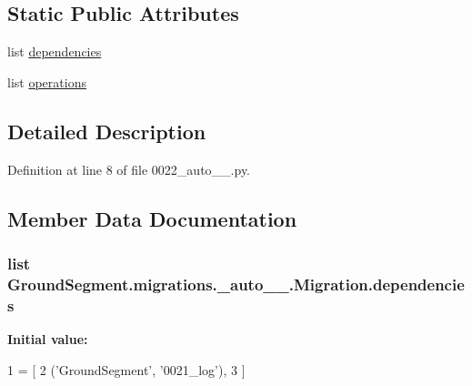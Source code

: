 \subsection*{Static Public Attributes}
\begin{DoxyCompactItemize}
\item 
list \hyperlink{class_ground_segment_1_1migrations_1_10022__auto__20161202__1258_1_1_migration_af42c26c63acd24177854a8b094bf46c3}{dependencies}
\item 
list \hyperlink{class_ground_segment_1_1migrations_1_10022__auto__20161202__1258_1_1_migration_ac5029b01431d0d17a0030c3db4018a16}{operations}
\end{DoxyCompactItemize}


\subsection{Detailed Description}


Definition at line 8 of file 0022\+\_\+auto\+\_\+\_.\+py.



\subsection{Member Data Documentation}
\hypertarget{class_ground_segment_1_1migrations_1_10022__auto__20161202__1258_1_1_migration_af42c26c63acd24177854a8b094bf46c3}{}
\subsubsection[{dependencies}]{\setlength{\rightskip}{0pt plus 5cm}list Ground\+Segment.\+migrations.\+\_\+auto\+\_\+\_.\+Migration.\+dependencies\hspace{0.3cm}{\ttfamily [static]}}\label{class_ground_segment_1_1migrations_1_10022__auto__20161202__1258_1_1_migration_af42c26c63acd24177854a8b094bf46c3}
{\bfseries Initial value\+:}
\begin{DoxyCode}
1 = [
2         (\textcolor{stringliteral}{'GroundSegment'}, \textcolor{stringliteral}{'0021\_log'}),
3     ]
\end{DoxyCode}


